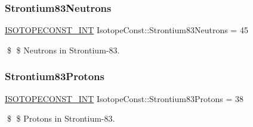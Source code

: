 \subsubsection{\texorpdfstring{Strontium83\+Neutrons}{Strontium83Neutrons}}
{\footnotesize\ttfamily \mbox{\hyperlink{group___isotope_const-_macros_ga5f18360b3e99483a35c32d789e62621c}{I\+S\+O\+T\+O\+P\+E\+C\+O\+N\+S\+T\+\_\+\+I\+NT}} Isotope\+Const\+::\+Strontium83\+Neutrons = 45}

\$ \$ Neutrons in Strontium-\/83. \mbox{\label{group___isotope_const-_strontium-_sr83_gad5c648c2b3d2daf9cfaa3e3760e8498b}} 
\subsubsection{\texorpdfstring{Strontium83\+Protons}{Strontium83Protons}}
{\footnotesize\ttfamily \mbox{\hyperlink{group___isotope_const-_macros_ga5f18360b3e99483a35c32d789e62621c}{I\+S\+O\+T\+O\+P\+E\+C\+O\+N\+S\+T\+\_\+\+I\+NT}} Isotope\+Const\+::\+Strontium83\+Protons = 38}

\$ \$ Protons in Strontium-\/83. 